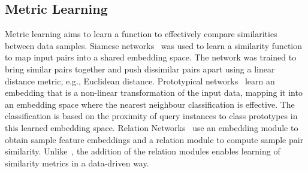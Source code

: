 \subsection{Metric Learning}
Metric learning aims to learn a function to effectively compare similarities between data samples. Siamese networks~\cite{koch_siamese_2015} was used to learn a similarity function to map input pairs into a shared embedding space. The network was trained to bring similar pairs together and push dissimilar pairs apart using a linear distance metric, e.g., Euclidean distance. Prototypical networks~\cite{snell_prototypical_2017} learn an embedding that is a non-linear transformation of the input data, mapping it into an embedding space where the nearest neighbour classification is effective. The classification is based on the proximity of query instances to class prototypes in this learned embedding space. Relation Networks~\cite{f_sung_learning_2018} use an embedding module to obtain sample feature embeddings and a relation module to compute sample pair similarity. Unlike~\cite{koch_siamese_2015, snell_prototypical_2017}, the addition of the relation modules enables learning of similarity metrics in a data-driven way. 


